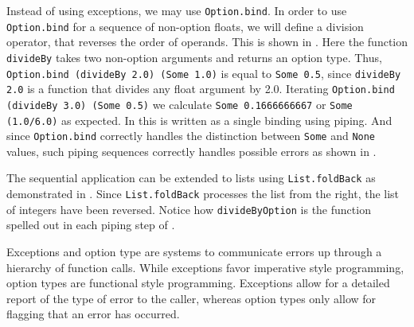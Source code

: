 Instead of using exceptions, we may use \lstinline{Option.bind}. In order to use \lstinline{Option.bind} for a sequence of non-option floats, we will define a division operator, that reverses the order of operands. This is shown in .
%
%
Here the function \lstinline{divideBy} takes two non-option arguments and returns an option type. Thus, \lstinline{Option.bind (divideBy 2.0) (Some 1.0)} is equal to \lstinline{Some 0.5}, since \lstinline{divideBy 2.0} is a function that divides any float argument by 2.0. Iterating \lstinline{Option.bind (divideBy 3.0) (Some 0.5)} we calculate \lstinline{Some 0.1666666667} or \lstinline{Some (1.0/6.0)} as expected. In  this is written as a single  binding using piping. And since \lstinline{Option.bind} correctly handles the distinction between \lstinline{Some} and \lstinline{None} values, such piping sequences correctly handles possible errors as shown in .

The sequential application can be extended to lists using \lstinline{List.foldBack} as demonstrated in .
%
%
Since \lstinline{List.foldBack} processes the list from the right, the list of integers have been reversed. Notice how \lstinline{divideByOption} is the function spelled out in each piping step of .

Exceptions and option type are systems to communicate errors up through a hierarchy of function calls. While exceptions favor imperative style programming, option types are functional style programming. Exceptions allow for a detailed report of the type of error to the caller, whereas option types only allow for flagging that an error has occurred.

\begin{comment}
  \begin{itemize}
  \item exn type Spec-4.0 Chapter 18.1
  \item Spec-4.0 Section 18.2.
  \item Husk, som if-else skal try-with branches være af samme type. Giv eksempel på parsning af argument til selvdefineret exception. Gå problem med divmed0exception igennem: 3 cases, failsafe værdier, undtagelser, eller option typer.
  \item Extend railway paradigm, \url{https://fsharpforfunandprofit.com/posts/computation-expressions-bind/}
  \item Extend notion of exception heriarchy and relation to catching or not.
  \end{itemize}
\end{comment}



